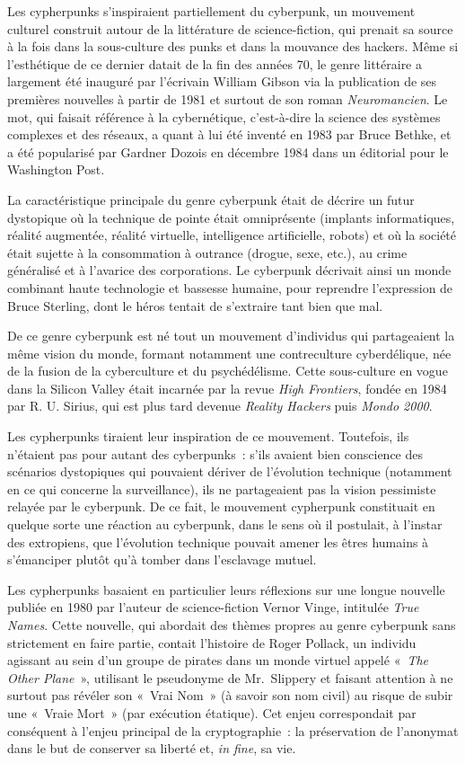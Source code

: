 \documentclass[
  a5paper,
  smalldemyvopaper,10pt,twoside,onecolumn,openright,extrafontsizes,hidelinks]{memoir}
\begin{document}
Les cypherpunks s'inspiraient partiellement du cyberpunk, un mouvement
culturel construit autour de la littérature de science-fiction, qui
prenait sa source à la fois dans la sous-culture des punks et dans la
mouvance des hackers. Même si l'esthétique de ce dernier datait de la
fin des années 70, le genre littéraire a largement été inauguré par
l'écrivain William Gibson via la publication de ses premières nouvelles
à partir de 1981 et surtout de son roman \emph{Neuromancien}. Le mot,
qui faisait référence à la cybernétique, c'est-à-dire la science des
systèmes complexes et des réseaux, a quant à lui été inventé en 1983 par
Bruce Bethke, et a été popularisé par Gardner Dozois en décembre 1984
dans un éditorial pour le Washington Post.

La caractéristique principale du genre cyberpunk était de décrire un
futur dystopique où la technique de pointe était omniprésente (implants
informatiques, réalité augmentée, réalité virtuelle, intelligence
artificielle, robots) et où la société était sujette à la consommation à
outrance (drogue, sexe, etc.), au crime généralisé et à l'avarice des
corporations. Le cyberpunk décrivait ainsi un monde combinant haute
technologie et bassesse humaine, pour reprendre l'expression de Bruce
Sterling, dont le héros tentait de s'extraire tant bien que mal.

De ce genre cyberpunk est né tout un mouvement d'individus qui
partageaient la même vision du monde, formant notamment une
contreculture cyberdélique, née de la fusion de la cyberculture et du
psychédélisme. Cette sous-culture en vogue dans la Silicon Valley était
incarnée par la revue \emph{High Frontiers}, fondée en 1984 par R. U.
Sirius, qui est plus tard devenue \emph{Reality Hackers} puis
\emph{Mondo 2000}.

Les cypherpunks tiraient leur inspiration de ce mouvement. Toutefois,
ils n'étaient pas pour autant des cyberpunks~: s'ils avaient bien
conscience des scénarios dystopiques qui pouvaient dériver de
l'évolution technique (notamment en ce qui concerne la surveillance),
ils ne partageaient pas la vision pessimiste relayée par le cyberpunk.
De ce fait, le mouvement cypherpunk constituait en quelque sorte une
réaction au cyberpunk, dans le sens où il postulait, à l'instar des
extropiens, que l'évolution technique pouvait amener les êtres humains à
s'émanciper plutôt qu'à tomber dans l'esclavage mutuel.

Les cypherpunks basaient en particulier leurs réflexions sur une longue
nouvelle publiée en 1980 par l'auteur de science-fiction Vernor Vinge,
intitulée \emph{True Names}. Cette nouvelle, qui abordait des thèmes
propres au genre cyberpunk sans strictement en faire partie, contait
l'histoire de Roger Pollack, un individu agissant au sein d'un groupe de
pirates dans un monde virtuel appelé «~\emph{The Other Plane}~»,
utilisant le pseudonyme de Mr.~Slippery et faisant attention à ne
surtout pas révéler son «~Vrai Nom~» (à savoir son nom civil) au risque
de subir une «~Vraie Mort~» (par exécution étatique). Cet enjeu
correspondait par conséquent à l'enjeu principal de la cryptographie~:
la préservation de l'anonymat dans le but de conserver sa liberté et,
\emph{in fine}, sa vie.
\end{document}
